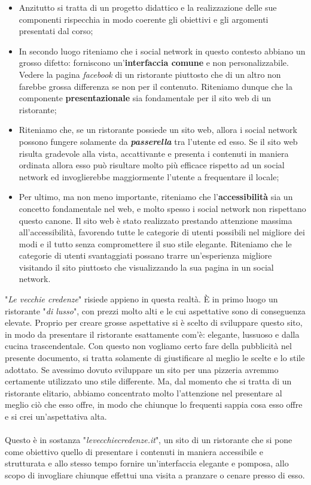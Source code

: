 \begin{itemize}

	\item Anzitutto si tratta di un progetto didattico e la realizzazione delle sue componenti rispecchia in modo coerente gli obiettivi e gli argomenti presentati dal corso;
	\item In secondo luogo riteniamo che i social network in questo contesto abbiano un grosso difetto: forniscono un'\textbf{interfaccia comune} e non personalizzabile. Vedere la pagina \textit{facebook} di un ristorante piuttosto che di un altro non farebbe grossa differenza se non per il contenuto. Riteniamo dunque che la componente \textbf{presentazionale} sia fondamentale per il sito web di un ristorante;
	\item Riteniamo che, se un ristorante possiede un sito web, allora i social network possono fungere solamente da \textbf{\textit{passerella}} tra l'utente ed esso. Se il sito web risulta gradevole alla vista, accattivante e presenta i contenuti in maniera ordinata allora esso può risultare molto più efficace rispetto ad un social network ed invoglierebbe maggiormente l'utente a frequentare il locale;
	\item Per ultimo, ma non meno importante, riteniamo che l'\textbf{accessibilità} sia un concetto fondamentale nel web, e molto spesso i social network non rispettano questo canone. Il sito web è stato realizzato prestando attenzione massima all'accessibilità, favorendo tutte le categorie di utenti possibili nel migliore dei modi e il tutto senza compromettere il suo stile elegante. Riteniamo che le categorie di utenti svantaggiati possano trarre un'esperienza migliore visitando il sito piuttosto che visualizzando la sua pagina in un social network.
	
\end{itemize}
"\textit{Le vecchie credenze}" risiede appieno in questa realtà. È in primo luogo un ristorante "\textit{di lusso}", con prezzi molto alti e le cui aspettative sono di conseguenza elevate. Proprio per creare grosse aspettative si è scelto di sviluppare questo sito, in modo da presentare il ristorante esattamente com'è: elegante, lussuoso e dalla cucina trascendentale. Con questo non vogliamo certo fare della pubblicità nel presente documento, si tratta solamente di giustificare al meglio le scelte e lo stile adottato. Se avessimo dovuto sviluppare un sito per una pizzeria avremmo certamente utilizzato uno stile differente. Ma, dal momento che si tratta di un ristorante elitario, abbiamo concentrato molto l'attenzione nel presentare al meglio ciò che esso offre, in modo che chiunque lo frequenti sappia cosa esso offre e si crei un'aspettativa alta. \\ \\
Questo è in sostanza "\textit{levecchiecredenze.it}", un sito di un ristorante che si pone come obiettivo quello di presentare i contenuti in maniera accessibile e strutturata e allo stesso tempo fornire un'interfaccia elegante e pomposa, allo scopo di invogliare chiunque effettui una visita a pranzare o cenare presso di esso.